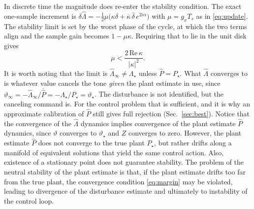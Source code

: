 \documentclass[11pt]{article}
\begin{document}
In discrete time the magnitude does re-enter the stability condition. The exact one-sample increment is $\delta\hat\Lambda=-\tfrac12\mu\big(\kappa\delta+\overline{\kappa}\,\overline{\delta}\,e^{2i\alpha}\big)$ with $\mu=g_xT_s$ as in \eqref{eq:update}. The stability limit is set by the worst phase of the cycle, at which the two terms align and the sample gain becomes $1-\mu\kappa$. Requiring that to lie in the unit disk gives
%
\begin{equation}
  \mu<\frac{2\,\mathrm{Re}\,\kappa}{|\kappa|^{2}}.
  \label{eq:stepbound}
\end{equation}
%
It is worth noting that the limit is $\hat\Lambda_\infty\neq\Lambda_\star$ unless $\hat P=P_\star$. What $\hat\Lambda$ converges to is whatever value cancels the tone \emph{given} the plant estimate in use, since $\vartheta_\infty=-\hat\Lambda_\infty/\overline{\hat P} =-\Lambda_\star/\overline{P_\star}=\vartheta_\star$.
%
The disturbance is not identified, but the canceling {command} is. For the control problem that is sufficient, and it is why an approximate calibration of $\hat P$ still gives full rejection (Sec.~\ref{sec:best}).
%
Notice that the convergence of the $\hat{\Lambda}$ dynamics implies convergence of the plant estimate $\hat{P}$ dynamics, since $\vartheta$ converges to $\vartheta_\star$ and $Z$ converges to zero. However, the plant estimate $\hat{P}$ does not converge to the true plant $P_\star$, but rather drifts along a manifold of equivalent solutions that yield the same control action. 
%
Also, existence of a stationary point does not guarantee stability. The problem of the neutral stability of the plant estimate is that, if the plant estimate drifts too far from the true plant, the convergence condition \eqref{eq:margin} may be violated, leading to divergence of the disturbance estimate and ultimately to instability of the control loop.
\end{document}
